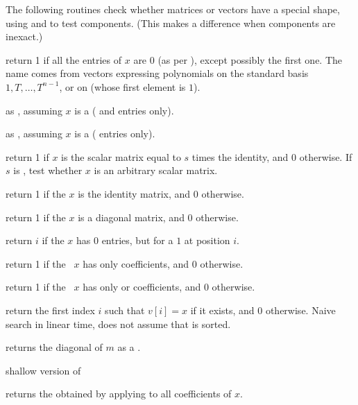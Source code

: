 
The following routines check whether matrices or vectors have a special
shape, using  and  to test components. (This makes
a difference when components are inexact.)

 return 1 if all the entries of $x$ are $0$
(as per ), except possibly the first one. The name comes from
vectors expressing polynomials on the standard basis $1,T,\dots, T^{n-1}$, or
on  (whose first element is $1$).

 as , assuming $x$ is a
 ( and  entries only).

 as , assuming $x$ is a
 ( entries only).

 return 1 if $x$ is the scalar matrix
equal to $s$ times the identity, and 0 otherwise. If $s$ is , test
whether $x$ is an arbitrary scalar matrix.

 return 1 if the  $x$ is the
identity matrix, and 0 otherwise.

 return 1 if the  $x$ is a
diagonal matrix, and 0 otherwise.

 return $i$ if the  $x$ has $0$ entries,
but for a $1$ at position $i$.

 return 1 if the ~$x$ has only
 coefficients, and 0 otherwise.

 return 1 if the ~$x$ has only
 or  coefficients, and 0 otherwise.

 return the first index $i$ such that
$v[i] = x$ if it exists, and $0$ otherwise. Naive search in linear time, does
not assume that  is sorted.

 returns the diagonal of $m$ as a .

 shallow version of 


 returns the  obtained by
applying  to all coefficients of $x$.

